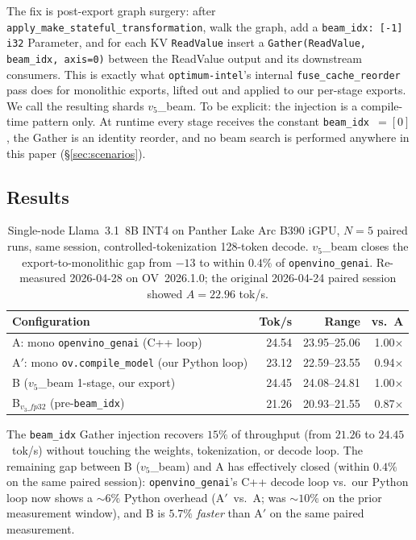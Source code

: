 \documentclass[11pt]{article}
\newcommand{\brk}{\discretionary{}{}{}}
\begin{document}
The fix is post-export graph surgery: after \texttt{apply\_\brk make\_\brk stateful\_\brk transformation}, walk the graph, add a \texttt{beam\_idx: [-1] i32} Parameter, and for each KV \texttt{ReadValue} insert a \texttt{Gather(ReadValue, beam\_idx, axis=0)} between the ReadValue output and its downstream consumers. This is exactly what \texttt{optimum-\brk intel}'s internal \texttt{fuse\_\brk cache\_\brk reorder} pass does for monolithic exports, lifted out and applied to our per-stage exports. We call the resulting shards $v_5$\_beam. To be explicit: the injection is a compile-time pattern only. At runtime every stage receives the constant \texttt{beam\_idx}~$=[0]$, the Gather is an identity reorder, and no beam search is performed anywhere in this paper (\S\ref{sec:scenarios}).

\subsection{Results}

\begin{table}[ht]
\centering
\caption{Single-node Llama~3.1~8B INT4 on Panther Lake Arc B390 iGPU, $N\!=\!5$ paired runs, same session, controlled-tokenization 128-token decode. $v_5$\_beam closes the export-to-monolithic gap from $-13$ to within $0.4\%$ of \texttt{openvino\_genai}. Re-measured 2026-04-28 on OV~2026.1.0; the original 2026-04-24 paired session showed $A=22.96$ tok/s.}
\label{tab:shard_parity}
\begin{tabular}{@{}lrrr@{}}
\toprule
Configuration & Tok/s & Range & vs.\ A \\
\midrule
A: mono \texttt{openvino\_genai} (C++ loop)       & 24.54 & 23.95--25.06 & 1.00$\times$ \\
A$'$: mono \texttt{ov.compile\_\brk model} (our Python loop) & 23.12 & 22.59--23.55 & 0.94$\times$ \\
B ($v_5$\_beam 1-stage, our export)               & 24.45 & 24.08--24.81 & 1.00$\times$ \\
B$_{v_3\_fp32}$ (pre-\texttt{beam\_idx})          & 21.26 & 20.93--21.55 & 0.87$\times$ \\
\bottomrule
\end{tabular}
\end{table}

The \texttt{beam\_idx} Gather injection recovers $15\%$ of throughput (from $21.26$ to $24.45$~tok/s) without touching the weights, tokenization, or decode loop. The remaining gap between B ($v_5$\_beam) and A has effectively closed (within $0.4\%$ on the same paired session): \texttt{openvino\_genai}'s C++ decode loop vs.\ our Python loop now shows a $\sim$$6\%$ Python overhead (A$'$~vs.\ A; was $\sim$$10\%$ on the prior measurement window), and B is $5.7\%$ \emph{faster} than A$'$ on the same paired measurement.
\end{document}

